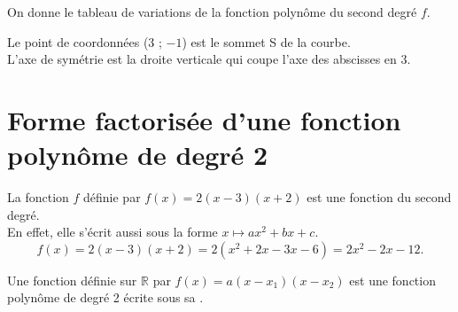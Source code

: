 	\begin{bexemple}
		On donne le tableau de variations de la fonction polynôme du second degré $f$.
		\begin{minipage}[c]{0.48\linewidth}
			
			Le point de coordonnées (3 ; $-1$) est le sommet S de la courbe.\\
			L'axe de symétrie est la droite verticale qui coupe l'axe des abscisses en 3.\\
		\end{minipage} \hfill
		\begin{minipage}[c]{0.48\linewidth}
		\end{minipage}
		
	\end{bexemple}
	
	\section{Forme factorisée d'une fonction polynôme de degré 2}
	
	\begin{bexemple}
		La fonction $f$ définie par $f(x)=2(x-3)(x+2)$ est une fonction du second degré.\\
		En effet, elle s'écrit aussi sous la forme $x \mapsto a x^{2}+b x+c$.
		$$
		f(x)=2(x-3)(x+2)=2\left(x^{2}+2 x-3 x-6\right)=2 x^{2}-2 x-12 .
		$$
	\end{bexemple}
	
	\begin{bdefi}
		Une fonction définie sur $\mathbb{R}$ par $f(x)=a\left(x-x_{1}\right)\left(x-x_{2}\right)$ est une fonction polynôme de degré 2 écrite sous sa .
	\end{bdefi}
	
